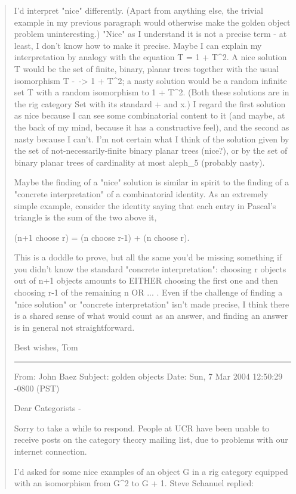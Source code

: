 \begin{quote}
I'd interpret "nice" differently.  (Apart from anything else, the
trivial example in my previous paragraph would otherwise make the golden
object problem uninteresting.)  "Nice" as I understand it is not a
precise term - at least, I don't know how to make it precise.  Maybe I
can explain my interpretation by analogy with the equation T = 1 + T^2. 
A nice solution T would be the set of finite, binary, planar trees
together with the usual isomorphism T -~-> 1 + T^2; a nasty solution
would be a random infinite set T with a random isomorphism to 1 + T^2. 
(Both these solutions are in the rig category Set with its standard +
and x.)  I regard the first solution as nice because I can see some
combinatorial content to it (and maybe, at the back of my mind, because
it has a constructive feel), and the second as nasty because I can't. 
I'm not certain what I think of the solution given by the set of
not-necessarily-finite binary planar trees (nice?), or by the set of
binary planar trees of cardinality at most aleph_5 (probably nasty).

Maybe the finding of a "nice" solution is similar in spirit to the
finding of a "concrete interpretation" of a combinatorial identity.  As
an extremely simple example, consider the identity saying that each
entry in Pascal's triangle is the sum of the two above it,

   (n+1 choose r) = (n choose r-1) + (n choose r).

This is a doddle to prove, but all the same you'd be missing something
if you didn't know the standard "concrete interpretation": choosing r
objects out of n+1 objects amounts to EITHER choosing the first one and
then choosing r-1 of the remaining n OR ... .  Even if the challenge of
finding a "nice solution" or "concrete interpretation" isn't made
precise, I think there is a shared sense of what would count as an
answer, and finding an answer is in general not straightforward.

Best wishes,
Tom


\par\noindent\rule{\textwidth}{0.4pt}


From: John Baez
Subject: golden objects
Date: Sun, 7 Mar 2004 12:50:29 -0800 (PST)

Dear Categorists -

Sorry to take a while to respond.  People at UCR have been unable to
receive posts on the category theory mailing list, due to problems with
our internet connection.  

I'd asked for some nice examples of an object G in a rig category
equipped with an isomorphism from G^2 to G + 1.  Steve Schanuel replied:


\end{quote}
